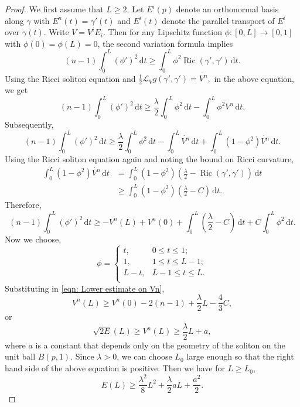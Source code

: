\documentclass[10pt,a4paper]{amsart}
\newcommand{\derivative}{\mathrm{d}}
\newcommand{\lie}[1]{\mathcal{L}_{#1}}
\DeclareMathOperator*{\ricci}{Ric}
\begin{document}
\begin{proof}
	We first assume that $L\geq 2$.
	Let $E^{i}(p)$ denote an orthonormal basis along $\gamma$ with $E^n(t) = {\gamma}'(t)$ and 
   $E^{i}(t)$  denote  the parallel transport of $E^i$ over $\gamma(t)$.  Write
$V = V^i E_i$. Then for any Lipschitz function $\phi:[0,L] \to [0,1]$ with $\phi(0) = \phi(L)=0$, the second variation formula implies
	$$ (n-1) \int_0^L (\phi ' )^2 \, \derivative t 
		\geq \int_0^L \phi^2 \ricci (\gamma' , \gamma ' ) \, \derivative t. $$
	 Using the Ricci soliton equation and 
	$ \frac{1}{2} \lie{V} g (\gamma' , \gamma ' ) = \dot{V^n}, $
	in the above equation, we get
	$$ (n-1) \int_0^L (\phi ' )^2 \, \derivative t 
		\geq \frac{\lambda}{2} \int_0^L \phi^2 \, \derivative t 
		- \int_0^L \phi^2 \dot{V^n} \, \derivative t  . $$
	Subsequently,
	$$ (n-1) \int_0^L (\phi ' )^2 \, \derivative t 
		\geq \frac{\lambda}{2} \int_0^L \phi^2 \, \derivative t 
		- \int_0^L \dot{V^n} \, \derivative t		
		+ \int_0^L (1-\phi^2) \dot{V^n} \, \derivative t . $$
Using  the Ricci soliton equation again and noting the bound on Ricci curvature,
	\begin{align*}
		\int_0^L \left(1-\phi^2\right) \dot{V^n} \, \derivative t &= 
		\int_0^L \left(1-\phi^2\right) \left( \frac{\lambda}{2} - \ricci \left(\gamma' , \gamma'\right) \right) \, \derivative t \\
		&\geq \int_0^L \left(1-\phi^2\right) \left( \frac{\lambda}{2} - C \right) \, \derivative t. 
	\end{align*}
	Therefore,
	\begin{equation}\label{eqn: Lower estimate on Vn}
		(n-1) \int_0^L (\phi ' )^2 \, \derivative t 
		\geq - V^n(L) + V^n(0)		
		+ \int_0^L \left( \frac{\lambda}{2} - C \right)  \, \derivative t  
		+ C \int_0^L \phi^2 \, \derivative t .
	\end{equation}
	Now we choose,
	\begin{equation*}
		\phi = 
			\begin{cases}
				t, 	& 0 \leq t \leq 1 ; \\
				1, 	& 1 \leq t \leq L-1 ; \\
				L-t, 	& L-1 \leq t \leq L. \\
			\end{cases} 
	\end{equation*}
	Substituting in \cref{eqn: Lower estimate on Vn},
	$$ V^n (L) \geq V^n (0) - 2 (n-1) +\frac{\lambda}{2} L - \frac{4}{3} C , $$
	or
	$$ \sqrt{2E} (L) \geq V^n(L) \geq \frac{\lambda}{2} L + a, $$
	where $a$ is a constant that depends only on the geometry of the soliton on the unit ball $B(p,1)$. Since $\lambda>0$, we can choose $L_0$ large enough so that the right hand side of the above equation is positive. Then  we have for $L\geq L_0$, 
	$$ E (L) \geq \frac{\lambda^2}{8}L^2 + \frac{\lambda}{2} a L + \frac{a^2}{2}. $$
\end{proof}
\end{document}
